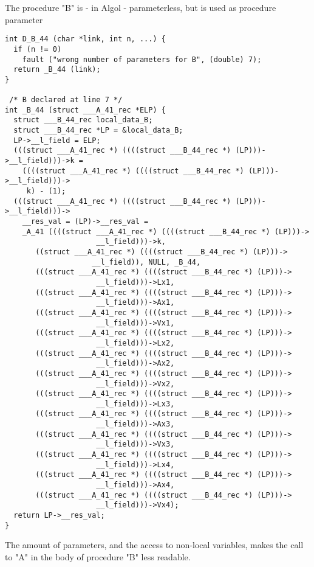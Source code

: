 \documentclass[11pt]{article}
\begin{document}
The procedure "B" is - in Algol - parameterless, but is used as procedure
parameter
{\footnotesize
\begin{verbatim}
int D_B_44 (char *link, int n, ...) {
  if (n != 0)
    fault ("wrong number of parameters for B", (double) 7);
  return _B_44 (link);
}

 /* B declared at line 7 */
int _B_44 (struct ___A_41_rec *ELP) {
  struct ___B_44_rec local_data_B;
  struct ___B_44_rec *LP = &local_data_B;
  LP->__l_field = ELP;
  (((struct ___A_41_rec *) ((((struct ___B_44_rec *) (LP)))->__l_field)))->k =
    ((((struct ___A_41_rec *) ((((struct ___B_44_rec *) (LP)))->__l_field)))->
     k) - (1);
  (((struct ___A_41_rec *) ((((struct ___B_44_rec *) (LP)))->__l_field)))->
    __res_val = (LP)->__res_val =
    _A_41 ((((struct ___A_41_rec *) ((((struct ___B_44_rec *) (LP)))->
				     __l_field)))->k,
	   ((struct ___A_41_rec *) ((((struct ___B_44_rec *) (LP)))->
				    __l_field)), NULL, _B_44,
	   (((struct ___A_41_rec *) ((((struct ___B_44_rec *) (LP)))->
				     __l_field)))->Lx1,
	   (((struct ___A_41_rec *) ((((struct ___B_44_rec *) (LP)))->
				     __l_field)))->Ax1,
	   (((struct ___A_41_rec *) ((((struct ___B_44_rec *) (LP)))->
				     __l_field)))->Vx1,
	   (((struct ___A_41_rec *) ((((struct ___B_44_rec *) (LP)))->
				     __l_field)))->Lx2,
	   (((struct ___A_41_rec *) ((((struct ___B_44_rec *) (LP)))->
				     __l_field)))->Ax2,
	   (((struct ___A_41_rec *) ((((struct ___B_44_rec *) (LP)))->
				     __l_field)))->Vx2,
	   (((struct ___A_41_rec *) ((((struct ___B_44_rec *) (LP)))->
				     __l_field)))->Lx3,
	   (((struct ___A_41_rec *) ((((struct ___B_44_rec *) (LP)))->
				     __l_field)))->Ax3,
	   (((struct ___A_41_rec *) ((((struct ___B_44_rec *) (LP)))->
				     __l_field)))->Vx3,
	   (((struct ___A_41_rec *) ((((struct ___B_44_rec *) (LP)))->
				     __l_field)))->Lx4,
	   (((struct ___A_41_rec *) ((((struct ___B_44_rec *) (LP)))->
				     __l_field)))->Ax4,
	   (((struct ___A_41_rec *) ((((struct ___B_44_rec *) (LP)))->
				     __l_field)))->Vx4);
  return LP->__res_val;
}
\end{verbatim}
}
The amount of parameters, and the access to non-local variables, makes the
call to "A" in the body of procedure "B" less readable.
\end{document}
